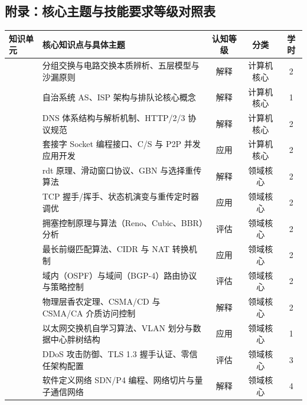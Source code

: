 \begin{strip}
\section{附录：核心主题与技能要求等级对照表}

\noindent\begin{tabularx}{\textwidth}{p{} Y c c c}
\toprule
\textbf{知识单元} & \textbf{核心知识点与具体主题} & \textbf{认知等级} & \textbf{分类} & \textbf{学时} \\
\midrule
{} 
& 分组交换与电路交换本质辨析、五层模型与沙漏原则 & 解释 & 计算机核心 & 2 \\
& 自治系统 AS、ISP 架构与排队论核心概念 & 解释 & 计算机核心 & 1 \\
\midrule
{} 
& DNS 体系结构与解析机制、HTTP/2/3 协议规范 & 解释 & 计算机核心 & 2 \\
& 套接字 Socket 编程接口、C/S 与 P2P 并发应用开发 & 应用 & 计算机核心 & 2 \\
\midrule
{} 
& rdt 原理、滑动窗口协议、GBN 与选择重传算法 & 解释 & 领域核心 & 2 \\
& TCP 握手/挥手、状态机演变与重传定时器调优 & 应用 & 领域核心 & 2 \\
& 拥塞控制原理与算法（Reno、Cubic、BBR）分析 & 评估 & 领域核心 & 2 \\
\midrule
{} 
& 最长前缀匹配算法、CIDR 与 NAT 转换机制 & 应用 & 领域核心 & 2 \\
& 域内（OSPF）与域间（BGP-4）路由协议与策略控制 & 评估 & 领域核心 & 2 \\
\midrule
{} 
& 物理层香农定理、CSMA/CD 与 CSMA/CA 介质访问控制 & 解释 & 领域核心 & 2 \\
& 以太网交换机自学习算法、VLAN 划分与数据中心胖树结构 & 应用 & 领域核心 & 1 \\
\midrule
{} & DDoS 攻击防御、TLS 1.3 握手认证、零信任架构配置 & 评估 & 领域核心 & 3 \\
\midrule
{} & 软件定义网络 SDN/P4 编程、网络切片与量子通信网络 & 解释 & 领域核心 & 4 \\
\bottomrule
\end{tabularx}
\end{strip}
